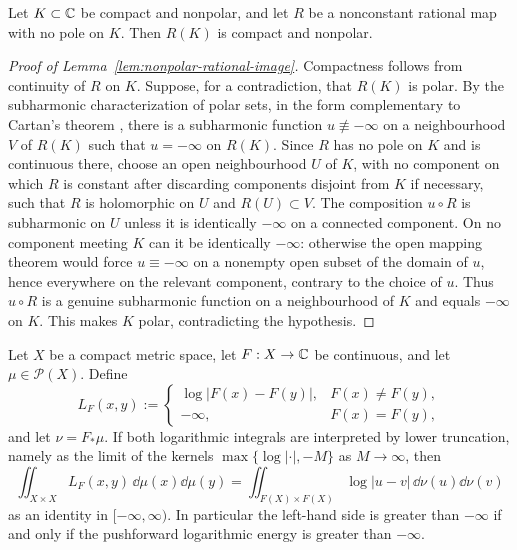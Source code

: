 \begin{lemma}\label{lem:nonpolar-rational-image}
Let \(K\subset\mathbb{C}\) be compact and nonpolar, and let \(R\) be a nonconstant rational map with no pole on \(K\).  Then \(R(K)\) is compact and nonpolar.
\end{lemma}

\begin{proof}[Proof of Lemma~\ref{lem:nonpolar-rational-image}]
Compactness follows from continuity of \(R\) on \(K\).  Suppose, for a contradiction, that \(R(K)\) is polar.  By the subharmonic characterization of polar sets, in the form complementary to Cartan's theorem \citep[Thm.~3.5.1, p.~65]{Ransford1995}, there is a subharmonic function \(u\not\equiv -\infty\) on a neighbourhood \(V\) of \(R(K)\) such that \(u=-\infty\) on \(R(K)\).  Since \(R\) has no pole on \(K\) and is continuous there, choose an open neighbourhood \(U\) of \(K\), with no component on which \(R\) is constant after discarding components disjoint from \(K\) if necessary, such that \(R\) is holomorphic on \(U\) and \(R(U)\subset V\).  The composition \(u\circ R\) is subharmonic on \(U\) unless it is identically \(-\infty\) on a connected component.  On no component meeting \(K\) can it be identically \(-\infty\): otherwise the open mapping theorem would force \(u\equiv -\infty\) on a nonempty open subset of the domain of \(u\), hence everywhere on the relevant component, contrary to the choice of \(u\).  Thus \(u\circ R\) is a genuine subharmonic function on a neighbourhood of \(K\) and equals \(-\infty\) on \(K\).  This makes \(K\) polar, contradicting the hypothesis.
\end{proof}

\begin{lemma}\label{lem:extended-pullback-energy-equals-pushforward-energy}
Let \(X\) be a compact metric space, let \(F:X\to\mathbb{C}\) be continuous, and let \(\mu\in\mathcal P(X)\).  Define
\[
L_F(x,y):=
\begin{cases}
\log|F(x)-F(y)|,&F(x)\ne F(y),\\
-\infty,&F(x)=F(y),
\end{cases}
\]
and let \(\nu=F_\ast\mu\).  If both logarithmic integrals are interpreted by lower truncation, namely as the limit of the kernels \(\max\{\log|\cdot|,-M\}\) as \(M\to\infty\), then
\[
\iint_{X\times X}L_F(x,y)\,\dd\mu(x)\dd\mu(y)
=
\iint_{F(X)\times F(X)}\log|u-v|\,\dd\nu(u)\dd\nu(v)
\]
as an identity in \([-\infty,\infty)\).  In particular the left-hand side is greater than \(-\infty\) if and only if the pushforward logarithmic energy is greater than \(-\infty\).
\end{lemma}

